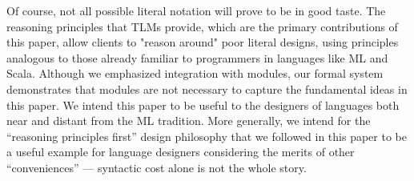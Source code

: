 \documentclass[acmsmall]{acmart}
\newcommand{\li}[1]{\lstinline[basicstyle=\ttfamily\fontsize{9pt}{1em}\selectfont]{#1}}
\begin{document}
Of course, not all possible literal notation will prove to be in good taste. %
The reasoning principles that TLMs provide, which are the primary contributions of this paper, allow clients to "reason around" poor literal designs, using principles analogous to those already familiar to programmers in languages like ML and Scala. Although we emphasized integration with modules, our formal system demonstrates that modules are not necessary to capture the fundamental ideas in this paper. We intend this paper to be useful to the designers of languages both near and distant from the ML tradition. More generally, we intend for the ``reasoning principles first'' design philosophy that we followed in this paper to be a useful example for language designers considering the merits of other ``conveniences'' --- syntactic cost alone is not the whole story.%

\end{document}
